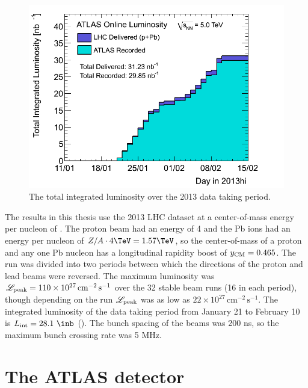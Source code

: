 \begin{figure}[t]
\includegraphics{sumLumiByDayUrgent.png}
\caption{The total integrated luminosity over the 2013 \pPb data taking period.}
\label{fig:int_lumi}
\end{figure}

The results in this thesis use the 2013 LHC \pPb dataset at a center-of-mass energy per nucleon of \pPbenergy.
The proton beam had an energy of 4 \TeV and the Pb ions had an energy per nucleon of $Z/A \cdot 4 \TeV = 1.57 \TeV$, so the center-of-mass of a proton and any one Pb nucleon has a longitudinal rapidity boost of $y_{\mathrm{CM}} = 0.465$.
The \pPb run was divided into two periods between which the directions of the proton and lead beams were reversed.
The maximum luminosity was $\mathscr{L}_\textrm{peak} = 110 \times 10^{27} \, \textrm{cm}^{-2} \, \textrm{s}^{-1}$ over the 32 stable beam runs (16 in each period), though depending on the run $\mathscr{L}_\textrm{peak}$ was as low as $22 \times 10^{27} \, \textrm{cm}^{-2} \, \textrm{s}^{-1}$.
The integrated luminosity of the data taking period from January 21 to February 10 is $\Lint = 28.1~\inb$ ().
The bunch spacing of the beams was 200 ns, so the maximum bunch crossing rate was 5 MHz.

\section{The ATLAS detector}
\label{sec:atlas}

